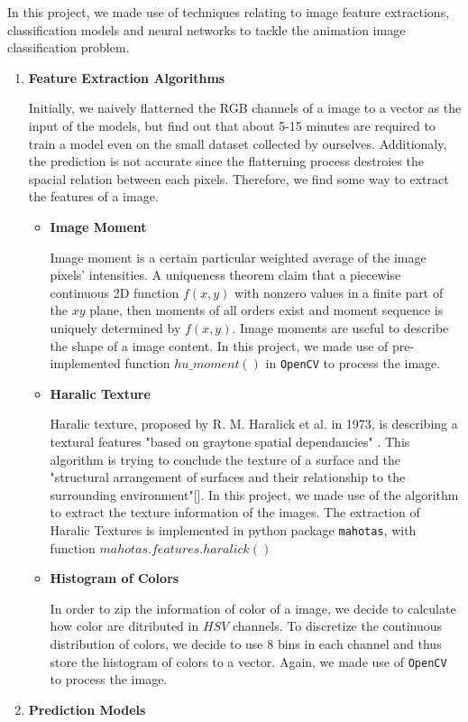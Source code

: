 \documentclass[11.5pt]{article}
\begin{document}
    In this project, we made use of techniques relating to image feature extractions, classification models and neural networks to tackle the animation image classification problem.

    \begin{enumerate}
        \item \textbf{Feature Extraction Algorithms}
        
        Initially, we naively flatterned the RGB channels of a image to a vector as the input of the models, but find out that about 5-15 minutes are required to train a model even on the small dataset collected by ourselves. Additionaly, the prediction is not accurate since the flatterning process destroies the spacial relation between each pixels. Therefore, we find some way to extract the features of a image.
        \begin{itemize}
            \item \textbf{Image Moment}
            
            Image moment is a certain particular weighted average of the image pixels' intensities. A uniqueness theorem \cite{img_moment} claim that a piecewise continuous 2D function $f(x,y)$ with nonzero values in a finite part of the $xy$ plane, then moments of all orders exist and moment sequence is uniquely determined by $f(x,y)$. Image moments are useful to describe the shape of a image content. In this project, we made use of pre-implemented function $hu\_moment()$ in \texttt{OpenCV}\cite{opencv_library} to process the image.
            \item \textbf{Haralic Texture}
            
            Haralic texture, proposed by R. M. Haralick et al. in 1973, is describing a textural features "based on graytone spatial dependancies" \cite{haralick}. This algorithm is trying to conclude the texture of a surface and the "structural arrangement of surfaces and their relationship to the surrounding environment"[]. In this project, we made use of the algorithm to extract the texture information of the images. The extraction of Haralic Textures is implemented in python package \texttt{mahotas}\cite{mahotas}, with function $mahotas.features.haralick()$
            \item \textbf{Histogram of Colors}
            
            In order to zip the information of color of a image, we decide to calculate how color are ditributed in $HSV$ channels. To discretize the continuous distribution of colors, we decide to use 8 bins in each channel and thus store the histogram of colors to a vector. Again, we made use of \texttt{OpenCV}\cite{opencv_library} to process the image.
        \end{itemize}
        \item \textbf{Prediction Models}
        

\end{enumerate}
\end{document}
